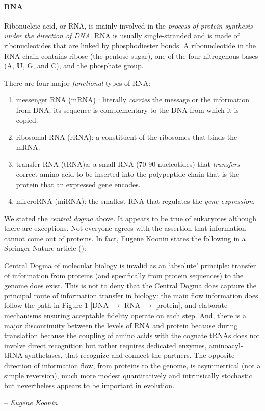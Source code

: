 \paragraph{RNA}
Ribonucleic acid, or RNA, is mainly involved in the \emph{process of protein synthesis under the direction of DNA}. RNA is usually single-stranded and is made of ribonucleotides that are linked by phosphodiester bonds. A ribonucleotide in the RNA chain contains ribose (the pentose sugar), one of the four nitrogenous bases (A, \textbf{U}, G, and C), and the phosphate group.

There are four major \emph{functional} types of RNA:
\begin{enumerate}
    \item messenger RNA (mRNA) : literally \emph{carries} the message or the information from DNA; its sequence is complementary to the DNA from which it is copied.
    \item ribosomal RNA (rRNA): a constituent of the ribosomes that binds the mRNA. 
    \item transfer RNA (tRNA)a: a small RNA (70-90 nucleotides) that \emph{transfers} correct amino acid to be inserted into the polypeptide chain that is the protein that an expressed gene encodes. 
    \item mircroRNA (miRNA): the smallest RNA that regulates the \emph{gene expression}.
\end{enumerate}

We stated the \hyperref[para: central-dogma]{\emph{central dogma}} above. It appears to be true of eukaryotes although there are exceptions. Not everyone agrees with the assertion that information cannot come out of proteins. In fact, Eugene Koonin states the following in a Springer Nature article (\cite{koonin}):
\epigraph{
    Central Dogma of molecular biology is invalid as an `absolute' principle: transfer of information from proteins (and specifically from protein sequences) to the genome does exist. This is not to deny that the Central Dogma does capture the principal route of information transfer in biology: the main flow information does follow the path in Figure 1 [DNA $\rightarrow$ RNA $\rightarrow$ protein], and elaborate mechanisms ensuring acceptable fidelity operate on each step. And, there is a major discontinuity between the levels of RNA and protein because during translation because the coupling of amino acids with the cognate tRNAs does not involve direct recognition but rather requires dedicated enzymes, aminoacyl-tRNA synthetases, that recognize and connect the partners. The opposite direction of information flow, from proteins to the genome, is asymmetrical (not a simple reversion), much more modest quantitatively and intrinsically stochastic but nevertheless appears to be important in evolution.
}
{
    -- \textit{Eugene Koonin} \cite{koonin}}
